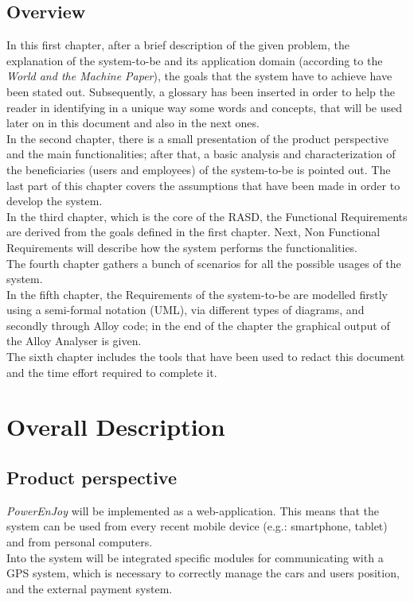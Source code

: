 \documentclass[11pt,a4paper]{report}
\begin{document}
\section{Overview}
In this first chapter, after a brief description of the given problem, the explanation of the system-to-be and its application domain (according to the \textit{World and the Machine Paper}), the goals that the system have to achieve have been stated out.
Subsequently, a glossary has been inserted in order to help the reader in identifying in a unique way some words and concepts, that will be used later on in this document and also in the next ones.\\
In the second chapter, there is a small presentation of the product perspective and the main functionalities; after that, a basic analysis and characterization of the beneficiaries (users and employees) of the system-to-be is pointed out. The last part of this chapter covers the assumptions that have been made in order to develop the system.\\
In the third chapter, which is the core of the RASD, the Functional Requirements are derived from the goals defined in the first chapter. Next, Non Functional Requirements will describe how the system performs the functionalities.\\
The fourth chapter gathers a bunch of scenarios for all the possible usages of the system.\\
In the fifth chapter, the Requirements of the system-to-be are modelled firstly using a semi-formal notation (UML), via different types of diagrams, and secondly through Alloy code; in the end of the chapter the graphical output of the Alloy Analyser is given.\\
The sixth chapter includes the tools that have been used to redact this document and the time effort required to complete it.
\chapter{Overall Description}
\section{Product perspective}
\textit{PowerEnJoy} will be implemented as a web-application. This means that the system can be used from every recent mobile device (e.g.: smartphone, tablet) and from personal computers.\\
Into the system will be integrated specific modules for communicating with a GPS system, which is necessary to correctly manage the cars and users position, and the external payment system.
\end{document}

